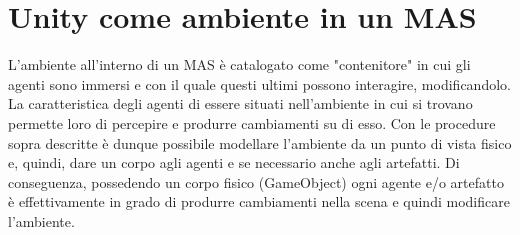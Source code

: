 \section{Unity come ambiente in un MAS}

L'ambiente all'interno di un MAS è catalogato come "contenitore" in cui gli agenti sono immersi e con il quale questi ultimi possono interagire, modificandolo. La caratteristica degli agenti di essere situati nell'ambiente in cui si trovano permette loro di percepire e produrre cambiamenti su di esso. Con le procedure sopra descritte è dunque possibile modellare l'ambiente da un punto di vista fisico e, quindi, dare un corpo agli agenti e se necessario anche agli artefatti. Di conseguenza, possedendo un corpo fisico (GameObject) ogni agente e/o artefatto è effettivamente in grado di produrre cambiamenti nella scena e quindi modificare l'ambiente.
